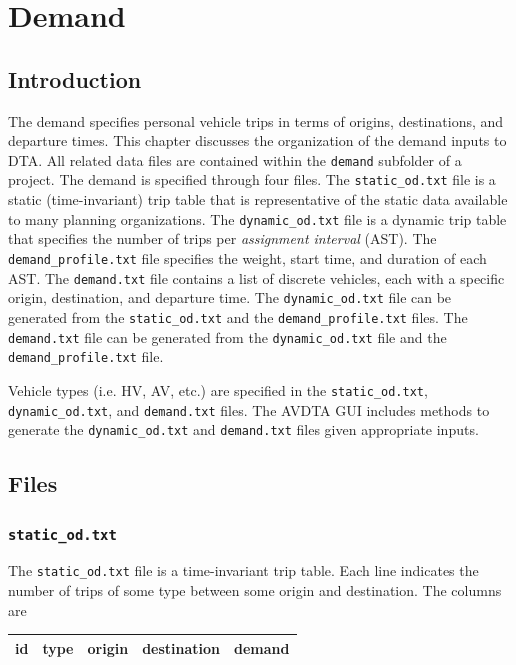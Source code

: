 \chapter{Demand}
\label{ch:demand}

\section{Introduction}

The demand specifies personal vehicle trips in terms of origins, destinations, and departure times. This chapter discusses the organization of the demand inputs to DTA. All related data files are contained within the \texttt{demand} subfolder of a project. The demand is specified through four files. The \texttt{static\_od.txt} file is a static (time-invariant) trip table that is representative of the static data available to many planning organizations. The \texttt{dynamic\_od.txt} file is a dynamic trip table that specifies the number of trips per \textit{assignment interval} (AST). The \texttt{demand\_profile.txt} file specifies the weight, start time, and duration of each AST. The \texttt{demand.txt} file contains a list of discrete vehicles, each with a specific origin, destination, and departure time. The \texttt{dynamic\_od.txt} file can be generated from the \texttt{static\_od.txt} and the \texttt{demand\_profile.txt} files. The \texttt{demand.txt} file can be generated from the \texttt{dynamic\_od.txt} file and the \texttt{demand\_profile.txt} file.

Vehicle types (i.e. HV, AV, etc.) are specified in the \texttt{static\_od.txt}, \texttt{dynamic\_od.txt}, and \texttt{demand.txt} files. The AVDTA GUI includes methods to generate the \texttt{dynamic\_od.txt} and \texttt{demand.txt} files given appropriate inputs.

\section{Files} 

\subsection{\texttt{static\_od.txt}}
\label{sec:staticod}

The \texttt{static\_od.txt} file is a time-invariant trip table. Each line indicates the number of trips of some type between some origin and destination. The columns are 
\begin{center}
\begin{tabular}{ccccc}
\hline
id & type & origin & destination & demand\\\hline
\end{tabular}
\end{center}
